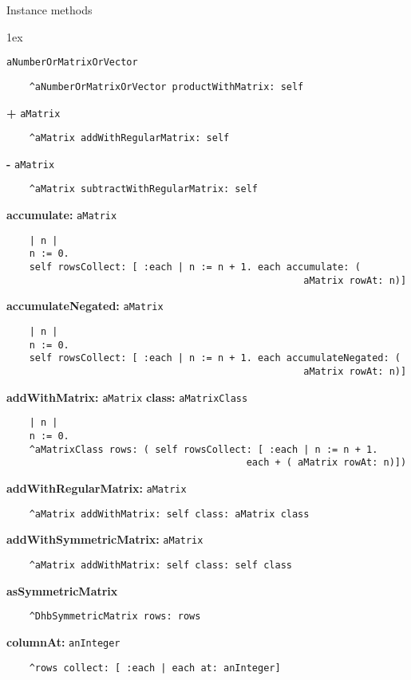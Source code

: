 Instance methods
{\parskip 1ex\par\noindent}
{\bf *} {\tt aNumberOrMatrixOrVector}
\begin{verbatim}
    ^aNumberOrMatrixOrVector productWithMatrix: self

\end{verbatim}
{\bf +} {\tt aMatrix}
\begin{verbatim}
    ^aMatrix addWithRegularMatrix: self

\end{verbatim}
{\bf -} {\tt aMatrix}
\begin{verbatim}
    ^aMatrix subtractWithRegularMatrix: self

\end{verbatim}
{\bf accumulate:} {\tt aMatrix}
\begin{verbatim}
    | n |
    n := 0.
    self rowsCollect: [ :each | n := n + 1. each accumulate: ( 
                                                    aMatrix rowAt: n)]

\end{verbatim}
{\bf accumulateNegated:} {\tt aMatrix}
\begin{verbatim}
    | n |
    n := 0.
    self rowsCollect: [ :each | n := n + 1. each accumulateNegated: ( 
                                                    aMatrix rowAt: n)]

\end{verbatim}
{\bf addWithMatrix:} {\tt aMatrix} {\bf class:} {\tt aMatrixClass}
\begin{verbatim}
    | n |
    n := 0.
    ^aMatrixClass rows: ( self rowsCollect: [ :each | n := n + 1. 
                                          each + ( aMatrix rowAt: n)])

\end{verbatim}
{\bf addWithRegularMatrix:} {\tt aMatrix}
\begin{verbatim}
    ^aMatrix addWithMatrix: self class: aMatrix class

\end{verbatim}
{\bf addWithSymmetricMatrix:} {\tt aMatrix}
\begin{verbatim}
    ^aMatrix addWithMatrix: self class: self class

\end{verbatim}
{\bf asSymmetricMatrix}
\begin{verbatim}
    ^DhbSymmetricMatrix rows: rows

\end{verbatim}
{\bf columnAt:} {\tt anInteger}
\begin{verbatim}
    ^rows collect: [ :each | each at: anInteger]

\end{verbatim}
